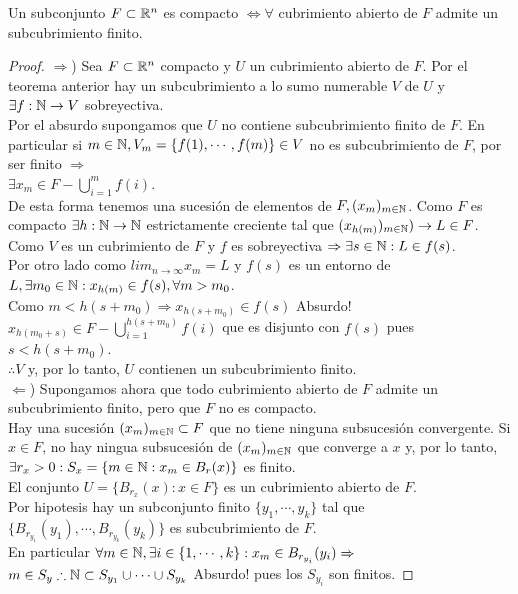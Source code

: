 \begin{corollary}
  Un subconjunto $F \subset \mathbb{R}^n$ es compacto $\iff \forall$ cubrimiento abierto de $F$ admite un subcubrimiento finito.
  \begin{proof}
    $\Rightarrow$) Sea $F \subset \mathbb{R}^n$ compacto y $U$ un cubrimiento abierto de $F$. Por el teorema anterior hay un subcubrimiento a lo sumo numerable $V$ de $U$ y $\exists f: \mathbb{N} \to V$ sobreyectiva. \\
    Por el absurdo supongamos que $U$ no contiene subcubrimiento finito de $F$. En particular si $m \in \mathbb{N}, V_m = \{ f(1), \cdots, f(m) \} \in V$ no es subcubrimiento de $F$, por ser finito $\Rightarrow$ \\
    $\exists x_m \in F - \bigcup_{i = 1}^m f(i)$. \\
    De esta forma tenemos una sucesión de elementos de $F, (x_m)_{m \in \mathbb{N}}$. Como $F$ es compacto $\exists h: \mathbb{N} \to \mathbb{N}$ estrictamente creciente tal que $(x_{h(m)})_{m \in \mathbb{N}}) \to L \in F$. \\
    Como $V$ es un cubrimiento de $F$ y $f$ es sobreyectiva $\Rightarrow \exists s \in \mathbb{N} : L \in f(s)$. \\
    Por otro lado como $lim_{n \to \infty} x_m = L$ y $f(s)$ es un entorno de $L, \exists m_0 \in \mathbb{N} : x_{h(m)} \in f(s), \forall m > m_0$. \\
    Como $m < h(s + m_0) \Rightarrow x_{h(s+m_0)} \in f(s)$ Absurdo! \\
    $x_{h(m_0 + s)} \in F - \bigcup_{i=1}^{h(s+m_0)} f(i)$ que es disjunto con $f(s)$ pues $s < h(s + m_0)$. \\
    $\therefore V$ y, por lo tanto, $U$ contienen un subcubrimiento finito. \\

    $\Leftarrow$) Supongamos ahora que todo cubrimiento abierto de $F$ admite un subcubrimiento finito, pero que $F$ no es compacto. \\
    Hay una sucesión $(x_m)_{m \in \mathbb{N}} \subset F$ que no tiene ninguna subsucesión convergente. Si $x \in F$, no hay ningua subsucesión de $(x_m)_{m \in \mathbb{N}}$ que converge a $x$ y, por lo tanto, $\exists r_x > 0 : S_x = \{ m \in \mathbb{N} : x_m \in B_r(x) \}$ es finito. \\
    El conjunto $U = \{ B_{r_x}(x) : x \in F \}$  es un cubrimiento abierto de $F$. \\
    Por hipotesis hay un subconjunto finito $\{ y_1, \cdots, y_k\}$ tal que $\{ B_{r_{y_1}}(y_1), \cdots, B_{r_{y_k}}(y_k) \}$ es subcubrimiento de $F$. \\
    En particular $\forall m \in \mathbb{N}, \exists i \in \{ 1, \cdots, k \} : x_m \in B_{r_{y_i}}(y_i) \Rightarrow$ \\
    $m \in S_y \therefore \mathbb{N} \subset S_{y_1} \cup \cdots \cup S_{y_k}$ Absurdo! pues los $S_{y_i}$ son finitos.
  \end{proof}
\end{corollary}

